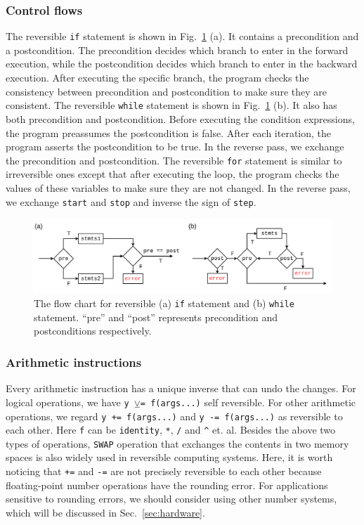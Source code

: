 \documentclass{article}
\newcommand{\<}{\langle}
\renewcommand{\>}{\rangle}
\newcommand{\Fig}[1]{Fig.~\ref{#1}}
\newcommand{\Sec}[1]{Sec.~\ref{#1}}
\theoremstyle{definition}\newtheorem{definition}{\textit{Definition}}
\begin{document}
\subsubsection{Control flows}
The reversible \texttt{if} statement is shown in \Fig{fig:controlflow} (a). It contains a precondition and a postcondition. The precondition decides which branch to enter in the forward execution, while the postcondition decides which branch to enter in the backward execution. After executing the specific branch, the program checks the consistency between precondition and postcondition to make sure they are consistent.
The reversible \texttt{while} statement is shown in \Fig{fig:controlflow} (b). It also has both precondition and postcondition. Before executing the condition expressions, the program preassumes the postcondition is false.
After each iteration, the program asserts the postcondition to be true. In the reverse pass, we exchange the precondition and postcondition.
The reversible \texttt{for} statement is similar to irreversible ones except that after executing the loop, the program checks the values of these variables to make sure they are not changed. In the reverse pass, we exchange \texttt{start} and \texttt{stop} and inverse the sign of \texttt{step}.
\begin{figure}
    \centerline{\includegraphics[width=0.9\columnwidth,trim={0 0cm 0 0cm},clip]{controlflow_v2.pdf}}
    \caption{The flow chart for reversible (a) \texttt{if} statement and (b) \texttt{while} statement. ``pre'' and ``post'' represents precondition and postconditions respectively.}\label{fig:controlflow}
\end{figure}

\subsubsection{Arithmetic instructions}
Every arithmetic instruction has a unique inverse that can undo the changes.
For logical operations, we have \texttt{y $\veebar$= f(args...)} self reversible.
For other arithmetic operations, we regard \texttt{y += f(args...)} and \texttt{y -= f(args...)} as reversible to each other. Here \texttt{f} can be \texttt{identity}, \texttt{*}, \texttt{/} and \texttt{\^} et. al.
Besides the above two types of operations, \texttt{SWAP} operation that exchanges the contents in two memory spaces is also widely used in reversible computing systems.
Here, it is worth noticing that \texttt{+=} and \texttt{-=} are not precisely reversible to each other because floating-point number operations have the rounding error. For applications sensitive to rounding errors, we should consider using other number systems, which will be discussed in \Sec{sec:hardware}.
\end{document}
